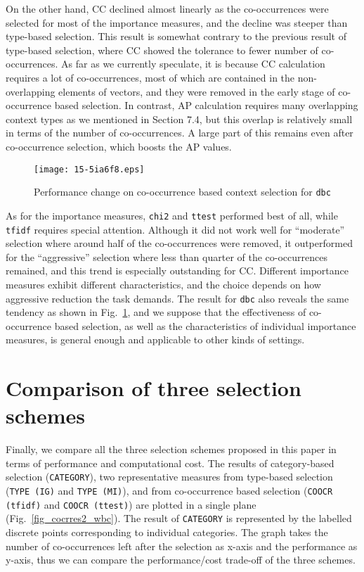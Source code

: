 \documentclass[english]{jnlp_1.4}
\begin{document}
On the other hand, CC declined almost linearly as the co-occurrences
were selected for most of the importance measures, and the decline was
steeper than type-based selection. This result is somewhat contrary to
the previous result of type-based selection, where CC showed the
tolerance to fewer number of co-occurrences. As far as we currently
speculate, it is because CC calculation requires a lot of
co-occurrences, most of which are contained in the non-overlapping
elements of vectors, and they were removed in the early stage of
co-occurrence based selection. In contrast, AP calculation requires
many overlapping context types as we mentioned in Section 7.4, but
this overlap is relatively small in terms of the number of
co-occurrences. A large part of this remains even after co-occurrence
selection, which boosts the AP values.


\begin{figure}[t]
\begin{center}
\texttt{[image: 15-5ia6f8.eps]}
\end{center}
\caption{Performance change on co-occurrence based context selection for {\tt dbc}}
\label{fig_cocrres_dbc}
\end{figure}

As for the importance measures, {\tt chi2} and {\tt ttest} performed
best of all, while {\tt tfidf} requires special attention. Although it
did not work well for ``moderate'' selection where around half of the
co-occurrences were removed, it outperformed for the ``aggressive''
selection where less than quarter of the co-occurrences remained, and
this trend is especially outstanding for CC. Different importance
measures exhibit different characteristics, and the choice depends on
how aggressive reduction the task demands. The result for {\tt dbc}
also reveals the same tendency as shown in Fig.~\ref{fig_cocrres_dbc},
and we suppose that the effectiveness of co-occurrence based
selection, as well as the characteristics of individual importance
measures, is general enough and applicable to other kinds of settings.

\section{Comparison of three selection schemes}

Finally, we compare all the three selection schemes proposed in this
paper in terms of performance and computational cost.  The results of
category-based selection ({\tt CATEGORY}), two representative measures
from type-based selection ({\tt TYPE (IG)} and {\tt TYPE (MI)}), and
from co-occurrence based selection ({\tt COOCR (tfidf)} and {\tt COOCR
(ttest)}) are plotted in a single plane (Fig.~\ref{fig_cocrres2_wbc}).
The result of {\tt CATEGORY} is represented by the labelled discrete
points corresponding to individual categories. The graph takes the
number of co-occurrences left after the selection as x-axis and the
performance as y-axis, thus we can compare the performance/cost
trade-off of the three schemes.
\end{document}
